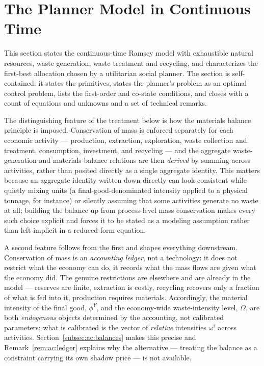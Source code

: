 
\section{The Planner Model in Continuous Time}
\label{sec:ac}

This section states the continuous-time Ramsey model with exhaustible natural resources, waste generation, waste treatment and recycling, and characterizes the first-best allocation chosen by a utilitarian social planner. The section is self-contained: it states the primitives, states the planner's problem as an optimal control problem, lists the first-order and co-state conditions, and closes with a count of equations and unknowns and a set of technical remarks.

The distinguishing feature of the treatment below is how the materials balance principle is imposed. Conservation of mass is enforced separately for each economic activity --- production, extraction, exploration, waste collection and treatment, consumption, investment, and recycling --- and the aggregate waste-generation and materials-balance relations are then \emph{derived} by summing across activities, rather than posited directly as a single aggregate identity. This matters because an aggregate identity written down directly can look consistent while quietly mixing units (a final-good-denominated intensity applied to a physical tonnage, for instance) or silently assuming that some activities generate no waste at all; building the balance up from process-level mass conservation makes every such choice explicit and forces it to be stated as a modeling assumption rather than left implicit in a reduced-form equation.

A second feature follows from the first and shapes everything downstream. Conservation of mass is an \emph{accounting ledger}, not a technology: it does not restrict what the economy can do, it records what the mass flows are given what the economy did. The genuine restrictions are elsewhere and are already in the model --- reserves are finite, extraction is costly, recycling recovers only a fraction of what is fed into it, production requires materials. Accordingly, the material intensity of the final good, $\phi^Y$, and the economy-wide waste-intensity level, $\Omega$, are both \emph{endogenous} objects determined by the accounting, not calibrated parameters; what is calibrated is the vector of \emph{relative} intensities $\omega^i$ across activities. Section~\ref{subsec:ac:balances} makes this precise and Remark~\ref{rem:ac:ledger} explains why the alternative --- treating the balance as a constraint carrying its own shadow price --- is not available.

